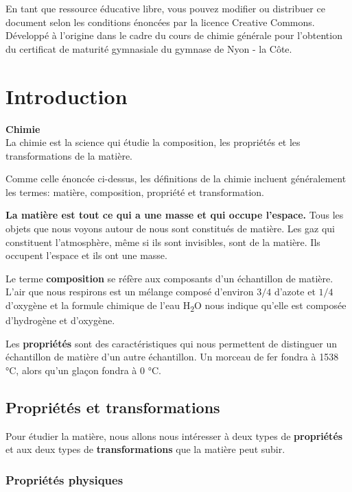 \documentclass[
  11pt,
  a4paper,
  openany]{book}
\begin{document}
En tant que ressource éducative libre, vous pouvez modifier ou distribuer ce document selon les conditions énoncées par la licence Creative Commons. Développé à l'origine dans le cadre du cours de chimie générale pour l'obtention du certificat de maturité gymnasiale du gymnase de Nyon - la Côte.

\hypertarget{introduction}{%
\chapter{Introduction}\label{introduction}}

\begin{tcolorbox}
\textbf{Chimie}\\
La chimie est la science qui étudie la composition, les propriétés et les transformations de la matière.

\end{tcolorbox}

Comme celle énoncée ci-dessus, les définitions de la chimie incluent généralement les termes: matière, composition, propriété et transformation.

\textbf{La matière est tout ce qui a une masse et qui occupe l'espace.} Tous les objets que nous voyons autour de nous sont constitués de matière. Les gaz qui constituent l'atmosphère, même si ils sont invisibles, sont de la matière. Ils occupent l'espace et ils ont une masse.

Le terme \textbf{composition} se réfère aux composants d'un échantillon de matière. L'air que nous respirons est un mélange composé d'environ \(3/4\) d'azote et \(1/4\) d'oxygène et la formule chimique de l'eau H\textsubscript{2}O nous indique qu'elle est composée d'hydrogène et d'oxygène.

Les \textbf{propriétés} sont des caractéristiques qui nous permettent de distinguer un échantillon de matière d'un autre échantillon. Un morceau de fer fondra à 1538 °C, alors qu'un glaçon fondra à 0 °C.

\hypertarget{propriuxe9tuxe9s-et-transformations}{%
\section{Propriétés et transformations}\label{propriuxe9tuxe9s-et-transformations}}

Pour étudier la matière, nous allons nous intéresser à deux types de \textbf{propriétés} et aux deux types de \textbf{transformations} que la matière peut subir.

\hypertarget{propriuxe9tuxe9s-physiques}{%
\subsection{Propriétés physiques}\label{propriuxe9tuxe9s-physiques}}
\end{document}
